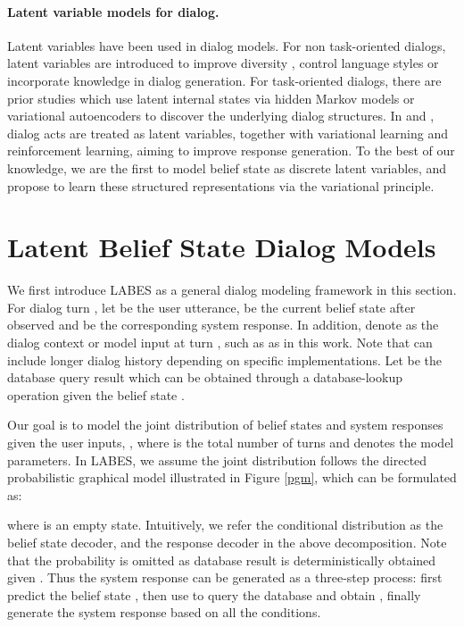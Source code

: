 \documentclass[11pt,a4paper]{article}
\newcommand{\modelname}{LABES}
\begin{document}
\paragraph{Latent variable models for dialog.}
	Latent variables have been used in dialog models. 
	For non task-oriented dialogs, latent variables are introduced to improve diversity \cite{serban2017hierarchical,zhao2017learning,gao2019a}, control language styles \cite{gao2019structuring} or incorporate knowledge \cite{kim2020sequential} in dialog generation. 
	For task-oriented dialogs, there are prior studies which use latent internal states via hidden Markov models \cite{zhai2014discovering} or variational autoencoders \cite{shi2019unsupervised} to discover the underlying dialog structures. 
	In \citet{wen2017latent} and \citet{zhao2019rethinking}, dialog acts are treated as latent variables, together with variational learning and reinforcement learning, aiming to improve response generation. 
	To the best of our knowledge, we are the first to model belief state as discrete latent variables, and propose to learn these structured representations via the variational principle. 
	
	\section{Latent Belief State Dialog Models}
\label{sec:model}
	We first introduce \modelname{} as a general dialog modeling framework in this section. For dialog turn , let  be the user utterance,  be the current belief state after observed  and  be the corresponding system response. In addition, denote  as the dialog context or model input at turn , such as  as in this work. Note that  can include longer dialog history depending on specific implementations. Let  be the database query result which can be obtained through a database-lookup operation given the belief state . 
	
	Our goal is to model the joint distribution of belief states and system responses given the user inputs, , where  is the total number of turns and  denotes the model parameters. In \modelname{}, we assume the joint distribution follows the directed probabilistic graphical model illustrated in Figure \ref{pgm}, which can be formulated as:
	
	where  is an empty state. 
	Intuitively, we refer the conditional distribution  as the belief state decoder, and  the response decoder in the above decomposition.
Note that the probability  is omitted as database result  is deterministically obtained given . 
	Thus the system response can be generated as a three-step process: first predict the belief state , then use  to query the database and obtain , finally generate the system response  based on all the conditions. 
	
\end{document}
